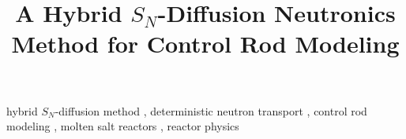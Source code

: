 \documentclass[review]{elsarticle}
\begin{document}
\begin{frontmatter}
\title{A Hybrid $S_N$-Diffusion Neutronics Method for Control Rod Modeling}






\begin{keyword}
hybrid $S_N$-diffusion method \sep
deterministic neutron transport \sep
control rod modeling \sep
molten salt reactors \sep
reactor physics
\end{keyword}


\end{frontmatter}
\glsresetall

\linenumbers








\pagebreak

\end{document}
